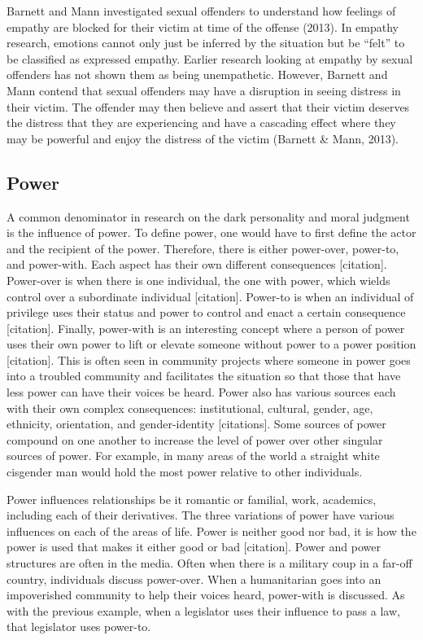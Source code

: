 \documentclass[
  donotrepeattitle,doc, 12pt, a4paper,floatsintext]{apa7}
\begin{document}
Barnett and Mann investigated sexual offenders to understand how feelings of empathy are blocked for their victim at time of the offense (2013). In empathy research, emotions cannot only just be inferred by the situation but be ``felt'' to be classified as expressed empathy. Earlier research looking at empathy by sexual offenders has not shown them as being unempathetic. However, Barnett and Mann contend that sexual offenders may have a disruption in seeing distress in their victim. The offender may then believe and assert that their victim deserves the distress that they are experiencing and have a cascading effect where they may be powerful and enjoy the distress of the victim (Barnett \& Mann, 2013).

\hypertarget{power}{%
\subsection{Power}\label{power}}

A common denominator in research on the dark personality and moral judgment is the influence of power. To define power, one would have to first define the actor and the recipient of the power. Therefore, there is either power-over, power-to, and power-with. Each aspect has their own different consequences {[}citation{]}. Power-over is when there is one individual, the one with power, which wields control over a subordinate individual {[}citation{]}. Power-to is when an individual of privilege uses their status and power to control and enact a certain consequence {[}citation{]}. Finally, power-with is an interesting concept where a person of power uses their own power to lift or elevate someone without power to a power position {[}citation{]}. This is often seen in community projects where someone in power goes into a troubled community and facilitates the situation so that those that have less power can have their voices be heard. Power also has various sources each with their own complex consequences: institutional, cultural, gender, age, ethnicity, orientation, and gender-identity {[}citations{]}. Some sources of power compound on one another to increase the level of power over other singular sources of power. For example, in many areas of the world a straight white cisgender man would hold the most power relative to other individuals.

Power influences relationships be it romantic or familial, work, academics, including each of their derivatives. The three variations of power have various influences on each of the areas of life. Power is neither good nor bad, it is how the power is used that makes it either good or bad {[}citation{]}. Power and power structures are often in the media. Often when there is a military coup in a far-off country, individuals discuss power-over. When a humanitarian goes into an impoverished community to help their voices heard, power-with is discussed. As with the previous example, when a legislator uses their influence to pass a law, that legislator uses power-to.
\end{document}
